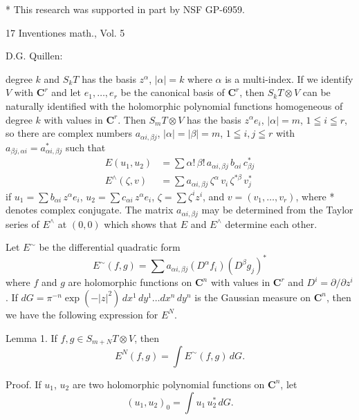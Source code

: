 \documentclass[11pt]{article}
\newcommand{\scanpage}[1]{\par\bigskip\noindent{\small\sffamily[scan #1]}\par}
\newcommand{\mspage}[1]{{\small\sffamily[p.\,#1]}}
\newcommand{\hand}[1]{\textcolor{blue}{#1}}
\begin{document}
* This research was supported in part by NSF GP-6959.

17 Inventiones math., Vol. 5

\mspage{\hand{50}}

\clearpage
\scanpage{162-5/51}
\mspage{238} \hfill D.G. Quillen:

degree $k$ and $S_k T$ has the basis $z^\alpha$, $|\alpha|=k$ where $\alpha$ is a multi-index. If we
identify $V$ with $\mathbf{C}^r$ and let $e_1,\dots,e_r$ be the canonical basis of $\mathbf{C}^r$, then
$S_k T\otimes V$ can be naturally identified with the holomorphic polynomial
functions homogeneous of degree $k$ with values in $\mathbf{C}^r$. Then $S_m T\otimes V$
has the basis $z^\alpha e_i$, $|\alpha|=m$, $1\leqq i\leqq r$, so there are complex numbers $a_{\alpha i,\beta j}$,
$|\alpha|=|\beta|=m$, $1\leqq i, j\leqq r$ with $a_{\beta j,\alpha i}=a^*_{\alpha i,\beta j}$ such that
\[
\begin{aligned}
E(u_1,u_2)&=\sum \alpha!\,\beta!\,a_{\alpha i,\beta j}\,b_{\alpha i}\,c^*_{\beta j}\\
E^\wedge(\zeta,v)&=\sum a_{\alpha i,\beta j}\,\zeta^\alpha\,v_i\,\zeta^{*\beta}\,v^*_j
\end{aligned}
\tag{2}
\]
if $u_1=\sum b_{\alpha i}\,z^\alpha e_i$, $u_2=\sum c_{\alpha i}\,z^\alpha e_i$, $\zeta=\sum \zeta^i z^i$, and $v=(v_1,\dots,v_r)$, where *
denotes complex conjugate. The matrix $a_{\alpha i,\beta j}$ may be determined from
the Taylor series of $E^\wedge$ at $(0,0)$ which shows that $E$ and $E^\wedge$ determine
each other.

Let $E^\sim$ be the differential quadratic form
\[
E^\sim(f,g)=\sum a_{\alpha i,\beta j}(D^\alpha f_i)(D^\beta g_j)^*
\]
where $f$ and $g$ are holomorphic functions on $\mathbf{C}^n$ with values in $\mathbf{C}^r$ and
$D^i=\partial/\partial z^i$. If $dG=\pi^{-n}\exp(-|z|^2)\,dx^1\,dy^1\dots dx^n\,dy^n$ is the Gaussian
measure on $\mathbf{C}^n$, then we have the following expression for $E^N$.

Lemma 1. If $f,g\in S_{m+N}T\otimes V$, then
\[
E^N(f,g)=\int E^\sim(f,g)\,dG.
\]

Proof. If $u_1$, $u_2$ are two holomorphic polynomial functions on $\mathbf{C}^n$, let
\[
(u_1,u_2)_0=\int u_1\,u_2^*\,dG.
\]
\end{document}
